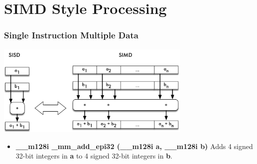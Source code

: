 \documentclass{beamer}
\begin{document}
\section{SIMD Style Processing}
\begin{frame}
\frametitle{Single Instruction Multiple Data}
\begin{center}
\includegraphics[width=0.7\textwidth]{img/simd.pdf}
\end{center}
\begin{itemize}[label=\textbullet,leftmargin=1em]
\item \textbf{\_\_m128i \_mm\_add\_epi32 (\_\_m128i a, \_\_m128i b)} Adds  4 signed 32-bit integers in \textbf{a} to 4 signed 32-bit integers in \textbf{b}.
\end{itemize}
\end{frame}
\end{document}
